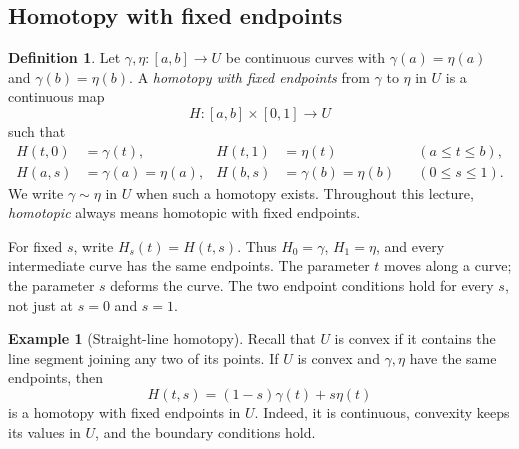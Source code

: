 \documentclass[11pt]{article}
\theoremstyle{plain}
\theoremstyle{definition}
\newtheorem{definition}[theorem]{Definition}
\newtheorem{example}[theorem]{Example}
\theoremstyle{remark}
\numberwithin{equation}{section}
\begin{document}
\subsection{Homotopy with fixed endpoints}
\begin{definition}\label{def:homotopy}
Let $\gamma,\eta\colon[a,b]\to U$ be continuous curves with
$\gamma(a)=\eta(a)$ and $\gamma(b)=\eta(b)$.
A \emph{homotopy with fixed endpoints} from $\gamma$ to $\eta$ in $U$
is a continuous map
\[
 H\colon[a,b]\times[0,1]\longrightarrow U
\]
such that
\begin{align*}
 H(t,0)&=\gamma(t),&H(t,1)&=\eta(t)&& (a\leq t\leq b),\\
 H(a,s)&=\gamma(a)=\eta(a),&H(b,s)&=\gamma(b)=\eta(b)&& (0\leq s\leq1).
\end{align*}
We write $\gamma\sim\eta$ in $U$ when such a homotopy exists.
Throughout this lecture, \emph{homotopic} always means homotopic with
fixed endpoints.
\end{definition}
For fixed $s$, write $H_s(t)=H(t,s)$. Thus $H_0=\gamma$,
$H_1=\eta$, and every intermediate curve has the same endpoints.
The parameter $t$ moves along a curve; the parameter $s$ deforms the curve.
The two endpoint conditions hold for every $s$, not just at $s=0$ and $s=1$.

\begin{center}
\end{center}

\begin{example}[Straight-line homotopy]
Recall that $U$ is convex if it contains the line segment joining any
two of its points. If $U$ is convex and $\gamma,\eta$ have the same
endpoints, then
\[
 H(t,s)=(1-s)\gamma(t)+s\eta(t)
\]
is a homotopy with fixed endpoints in $U$. Indeed, it is continuous,
convexity keeps its values in $U$, and the boundary conditions hold.
\end{example}
\end{document}
